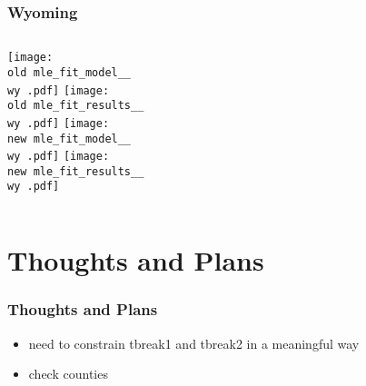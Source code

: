 \documentclass{beamer}
\newcommand{\old}{current_two_stage_output/pyseir/state_summaries/reports/}
\newcommand{\new}{new_shortest_t_delta/pyseir/state_summaries/reports/}
\newcommand{\wy}{Wyoming__56}
\begin{document}
\begin{frame}
\frametitle{Wyoming}
    \begin{columns}[t]
       \texttt{[image: \\old mle\_fit\_model\_\_\\wy .pdf]}
       \texttt{[image: \\old mle\_fit\_results\_\_\\wy .pdf]}   
       \texttt{[image: \\new mle\_fit\_model\_\_\\wy .pdf]}
       \texttt{[image: \\new mle\_fit\_results\_\_\\wy .pdf]}   
\end{columns}
\end{frame}

\iffalse


\fi

\section{Thoughts and Plans} %
\begin{frame}
\frametitle{Thoughts and Plans}
\begin{itemize}[label={-}]
\item need to constrain tbreak1 and tbreak2 in a meaningful way
\item check counties

\end{itemize}
\end{frame}
\end{document}
